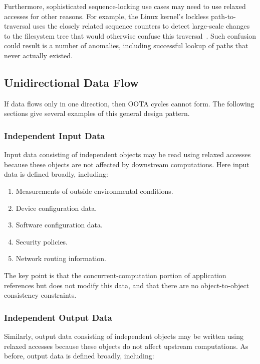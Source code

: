 \documentclass[10]{article}
\begin{document}
Furthermore, sophisticated sequence-locking use cases may need to
use relaxed accesses for other reasons.
For example, the Linux kernel's lockless path-to- traversal uses
the closely related sequence counters to detect large-scale changes
to the filesystem tree that would otherwise confuse this
traversal~\cite{NeilBrown2015PathnameLookup,NeilBrown2015RCUwalk}.
Such confusion could result is a number of anomalies, including successful
lookup of paths that never actually existed.

\subsection{Unidirectional Data Flow}
\label{sec:Unidirectional Data Flow}

If data flows only in one direction, then OOTA cycles cannot form.
The following sections give several examples of this general design
pattern.

\subsubsection{Independent Input Data}
\label{sec:Independent Input Data}

Input data consisting of independent objects may be read using relaxed
accesses because these objects are not affected by downstream computations.
Here input data is defined broadly, including:

\begin{enumerate}
\item	Measurements of outside environmental conditions.
\item	Device configuration data.
\item	Software configuration data.
\item	Security policies.
\item	Network routing information.
\end{enumerate}

The key point is that the concurrent-computation portion of application
references but does not modify this data, and that there are no
object-to-object consistency constraints.

\subsubsection{Independent Output Data}
\label{sec:Independent Output Data}

Similarly, output data consisting of independent objects may be written
using relaxed accesses because these objects do not affect upstream
computations.
As before, output data is defined broadly, including:
\end{document}
